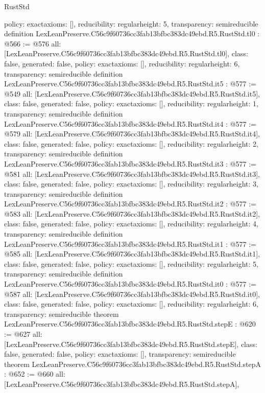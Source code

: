 \begin{lexlean}{RustStd}
\begin{coremodule}
{  policy: exact{axioms: []},
  reducibility: regular{height: 5},
  transparency: semireducible
}
definition LexLeanPreserve.C56c9f60736cc3fab13bfbc383dc49ebd.R5.RustStd.tl0 : @566 := @576 {
  all: [LexLeanPreserve.C56c9f60736cc3fab13bfbc383dc49ebd.R5.RustStd.tl0],
  class: false,
  generated: false,
  policy: exact{axioms: []},
  reducibility: regular{height: 6},
  transparency: semireducible
}
definition LexLeanPreserve.C56c9f60736cc3fab13bfbc383dc49ebd.R5.RustStd.it5 : @577 := @549 {
  all: [LexLeanPreserve.C56c9f60736cc3fab13bfbc383dc49ebd.R5.RustStd.it5],
  class: false,
  generated: false,
  policy: exact{axioms: []},
  reducibility: regular{height: 1},
  transparency: semireducible
}
definition LexLeanPreserve.C56c9f60736cc3fab13bfbc383dc49ebd.R5.RustStd.it4 : @577 := @579 {
  all: [LexLeanPreserve.C56c9f60736cc3fab13bfbc383dc49ebd.R5.RustStd.it4],
  class: false,
  generated: false,
  policy: exact{axioms: []},
  reducibility: regular{height: 2},
  transparency: semireducible
}
definition LexLeanPreserve.C56c9f60736cc3fab13bfbc383dc49ebd.R5.RustStd.it3 : @577 := @581 {
  all: [LexLeanPreserve.C56c9f60736cc3fab13bfbc383dc49ebd.R5.RustStd.it3],
  class: false,
  generated: false,
  policy: exact{axioms: []},
  reducibility: regular{height: 3},
  transparency: semireducible
}
definition LexLeanPreserve.C56c9f60736cc3fab13bfbc383dc49ebd.R5.RustStd.it2 : @577 := @583 {
  all: [LexLeanPreserve.C56c9f60736cc3fab13bfbc383dc49ebd.R5.RustStd.it2],
  class: false,
  generated: false,
  policy: exact{axioms: []},
  reducibility: regular{height: 4},
  transparency: semireducible
}
definition LexLeanPreserve.C56c9f60736cc3fab13bfbc383dc49ebd.R5.RustStd.it1 : @577 := @585 {
  all: [LexLeanPreserve.C56c9f60736cc3fab13bfbc383dc49ebd.R5.RustStd.it1],
  class: false,
  generated: false,
  policy: exact{axioms: []},
  reducibility: regular{height: 5},
  transparency: semireducible
}
definition LexLeanPreserve.C56c9f60736cc3fab13bfbc383dc49ebd.R5.RustStd.it0 : @577 := @587 {
  all: [LexLeanPreserve.C56c9f60736cc3fab13bfbc383dc49ebd.R5.RustStd.it0],
  class: false,
  generated: false,
  policy: exact{axioms: []},
  reducibility: regular{height: 6},
  transparency: semireducible
}
theorem LexLeanPreserve.C56c9f60736cc3fab13bfbc383dc49ebd.R5.RustStd.stepE : @620 := @627 {
  all: [LexLeanPreserve.C56c9f60736cc3fab13bfbc383dc49ebd.R5.RustStd.stepE],
  class: false,
  generated: false,
  policy: exact{axioms: []},
  transparency: semireducible
}
theorem LexLeanPreserve.C56c9f60736cc3fab13bfbc383dc49ebd.R5.RustStd.stepA : @652 := @660 {
  all: [LexLeanPreserve.C56c9f60736cc3fab13bfbc383dc49ebd.R5.RustStd.stepA],
}
\end{coremodule}
\end{lexlean}

